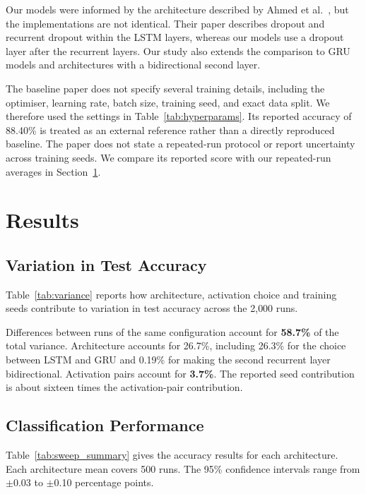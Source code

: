 \documentclass[conference,a4paper]{IEEEtran}
\begin{document}
Our models were informed by the architecture described
by Ahmed et al.~\cite{ahmed2025}, but the implementations
are not identical. Their paper describes dropout and
recurrent dropout within the LSTM layers, whereas our
models use a dropout layer after the recurrent layers.
Our study also extends the comparison to GRU models
and architectures with a bidirectional second layer.

The baseline paper does not specify several training
details, including the optimiser, learning rate, batch
size, training seed, and exact data split. We therefore
used the settings in Table~\ref{tab:hyperparams}.
Its reported accuracy of 88.40\% is treated as an
external reference rather than a directly reproduced
baseline. The paper does not state a repeated-run
protocol or report uncertainty across training seeds.
We compare its reported score with our repeated-run
averages in Section~\ref{sec:results}.

\FloatBarrier\section{Results}
\label{sec:results}

\subsection{Variation in Test Accuracy}

Table~\ref{tab:variance} reports how architecture, activation
choice and training seeds contribute to variation in test
accuracy across the 2{,}000 runs.

Differences between runs of the same configuration account
for \textbf{58.7\%} of the total variance. Architecture accounts
for 26.7\%, including 26.3\% for the choice between LSTM and
GRU and 0.19\% for making the second recurrent layer
bidirectional. Activation pairs account for \textbf{3.7\%}.
The reported seed contribution is about sixteen times the
activation-pair contribution.



\subsection{Classification Performance}

Table~\ref{tab:sweep_summary} gives the accuracy results for
each architecture. Each architecture mean covers 500 runs.
The 95\% confidence intervals range from $\pm$0.03 to
$\pm$0.10 percentage points.
\end{document}
